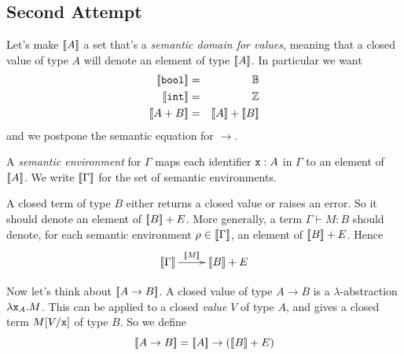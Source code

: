 \documentclass[runningheads,12pt]{llncs}
\begin{document}


\subsection{Second Attempt}

Let's make $[\![ {A} ]\!]$ a set that's a \emph{semantic domain for values}, meaning that a closed value of type $A$ will denote an element of type $[\![ {A} ]\!]$.  In particular we want
\begin{eqnarray*}
  \seman{\ttbool} & = & \bool \\
  \seman{\ttint} & = & \integ \\ 
  \seman{A+B} & = & \seman{A} + \seman{B} \\
\end{eqnarray*}
and we postpone the semantic equation for $\rightarrow$.

A \emph{semantic environment} for $\Gamma$ maps each identifier $\mathtt{x}:A$ in $\Gamma$ to an element of $[\![ {A} ]\!]$. We write $[\![ {\Gamma} ]\!]$ for the set of semantic environments.

A closed term of type $B$ either returns a closed value or raises an error.  So it should denote an element of $[\![ {B} ]\!]  + E$.   More generally, a term $\Gamma \vdash M : B$ should denote, for each semantic environment $\rho \in [\![ {\Gamma} ]\!]$, an element of $[\![ {B} ]\!]  + E$.   Hence
\begin{displaymath}
  \centremorphism{\seman{M}}{\seman{\Gamma}}{\seman{B} + E}
\end{displaymath}

Now let's think about $[\![ {A \rightarrow B} ]\!]$.  A closed value of type $A \rightarrow B$  is a $\lambda$-abstraction $\lambda \mathtt{x}_{A}. M$.  This can be applied to a closed \emph{value} $V$ of type $A$, and gives a closed term $M[V/\mathtt{x}]$ of type $B$.  So we define
  \begin{displaymath}
    [\![ {A \rightarrow B} ]\!] = [\![ {A} ]\!] \rightarrow ([\![ {B} ]\!] +  E)
  \end{displaymath}
\end{document}
